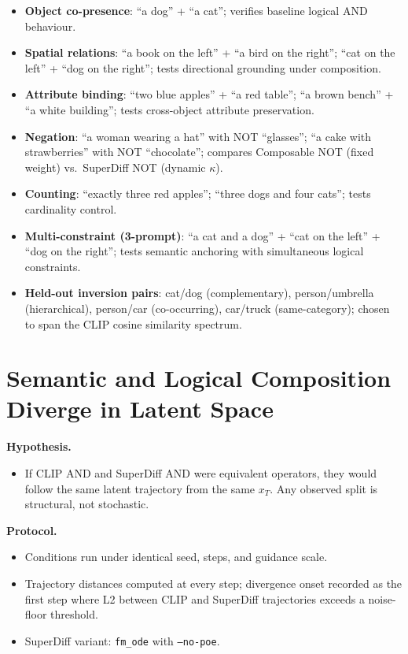\documentclass[runningheads]{llncs}
\begin{document}
\begin{itemize}
  \item \textbf{Object co-presence}: ``a dog'' + ``a cat''; verifies
    baseline logical AND behaviour.
  \item \textbf{Spatial relations}: ``a book on the left'' + ``a bird on
    the right''; ``cat on the left'' + ``dog on the right''; tests
    directional grounding under composition.
  \item \textbf{Attribute binding}: ``two blue apples'' + ``a red table'';
    ``a brown bench'' + ``a white building''; tests cross-object attribute
    preservation.
  \item \textbf{Negation}: ``a woman wearing a hat'' with NOT ``glasses'';
    ``a cake with strawberries'' with NOT ``chocolate''; compares Composable
    NOT (fixed weight) vs.\ SuperDiff NOT (dynamic $\kappa$).
  \item \textbf{Counting}: ``exactly three red apples''; ``three dogs and
    four cats''; tests cardinality control.
  \item \textbf{Multi-constraint (3-prompt)}: ``a cat and a dog'' +
    ``cat on the left'' + ``dog on the right''; tests semantic anchoring
    with simultaneous logical constraints.
  \item \textbf{Held-out inversion pairs}: cat/dog (complementary),
    person/umbrella (hierarchical), person/car (co-occurring), car/truck
    (same-category); chosen to span the CLIP cosine similarity spectrum.
\end{itemize}

\section{Semantic and Logical Composition Diverge in Latent Space}

\textbf{Hypothesis.}
\begin{itemize}
  \item If CLIP AND and SuperDiff AND were equivalent operators, they would
    follow the same latent trajectory from the same $x_T$.
    Any observed split is structural, not stochastic.
\end{itemize}

\textbf{Protocol.}
\begin{itemize}
  \item Conditions run under identical seed, steps, and guidance scale.
  \item Trajectory distances computed at every step; divergence onset
    recorded as the first step where L2 between CLIP and SuperDiff
    trajectories exceeds a noise-floor threshold.
  \item SuperDiff variant: \texttt{fm\_ode} with \texttt{--no-poe}.
\end{itemize}
\end{document}
